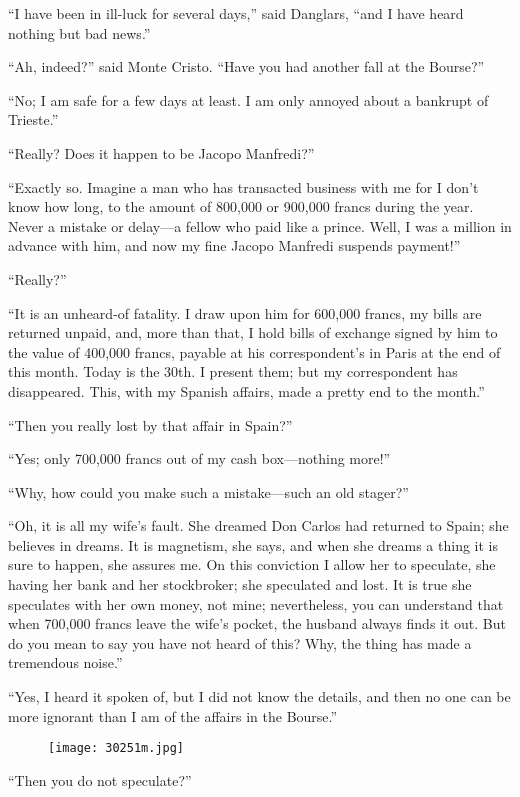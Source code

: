 “I have been in ill-luck for several days,” said Danglars, “and I have
heard nothing but bad news.”

“Ah, indeed?” said Monte Cristo. “Have you had another fall at the
Bourse?”

“No; I am safe for a few days at least. I am only annoyed about a
bankrupt of Trieste.”

“Really? Does it happen to be Jacopo Manfredi?”

“Exactly so. Imagine a man who has transacted business with me for I
don’t know how long, to the amount of 800,000 or 900,000 francs during
the year. Never a mistake or delay—a fellow who paid like a prince.
Well, I was a million in advance with him, and now my fine Jacopo
Manfredi suspends payment!”

“Really?”

“It is an unheard-of fatality. I draw upon him for 600,000 francs, my
bills are returned unpaid, and, more than that, I hold bills of
exchange signed by him to the value of 400,000 francs, payable at his
correspondent’s in Paris at the end of this month. Today is the 30th. I
present them; but my correspondent has disappeared. This, with my
Spanish affairs, made a pretty end to the month.”

“Then you really lost by that affair in Spain?”

“Yes; only 700,000 francs out of my cash box—nothing more!”

“Why, how could you make such a mistake—such an old stager?”

“Oh, it is all my wife’s fault. She dreamed Don Carlos had returned to
Spain; she believes in dreams. It is magnetism, she says, and when she
dreams a thing it is sure to happen, she assures me. On this conviction
I allow her to speculate, she having her bank and her stockbroker; she
speculated and lost. It is true she speculates with her own money, not
mine; nevertheless, you can understand that when 700,000 francs leave
the wife’s pocket, the husband always finds it out. But do you mean to
say you have not heard of this? Why, the thing has made a tremendous
noise.”

“Yes, I heard it spoken of, but I did not know the details, and then no
one can be more ignorant than I am of the affairs in the Bourse.”

\begin{figure}[ht]
\texttt{[image: 30251m.jpg]}
\end{figure}

“Then you do not speculate?”

